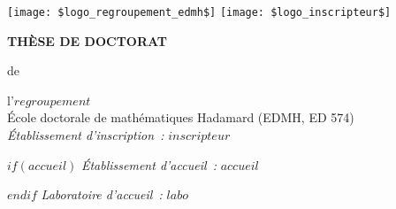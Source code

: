 \documentclass[a4paper,12pt]{reedthesis}
\begin{document}
\thispagestyle{empty}
\vspace{-2cm}

\voffset-10pt


\noindent
\hspace*{-1cm}\hbox{\texttt{[image: \$logo\_regroupement\_edmh\$]}}
\hfill
{}
\hfill
\hbox{\texttt{[image: \$logo\_inscripteur\$]}}
\vspace{7mm}

\begin{center}
{\Large\bf THÈSE DE DOCTORAT}
\end{center}
\begin{center}
{de }
\end{center}
\begin{center}
 {\Large\sc l'$regroupement$}\\
  \vspace*{0.4cm}
École doctorale de mathématiques Hadamard (EDMH, ED 574)\\
 \vspace*{0.4cm}
{\small \it Établissement d'inscription~:} $inscripteur$

 \vspace*{0.2cm}
$if(accueil)$
{\small \it Établissement d'accueil~:} $accueil$

\vspace*{0.2cm}
$endif$
{\small \it Laboratoire d'accueil~:} $labo$

\vspace*{0.2cm}
\end{center}
\end{document}
